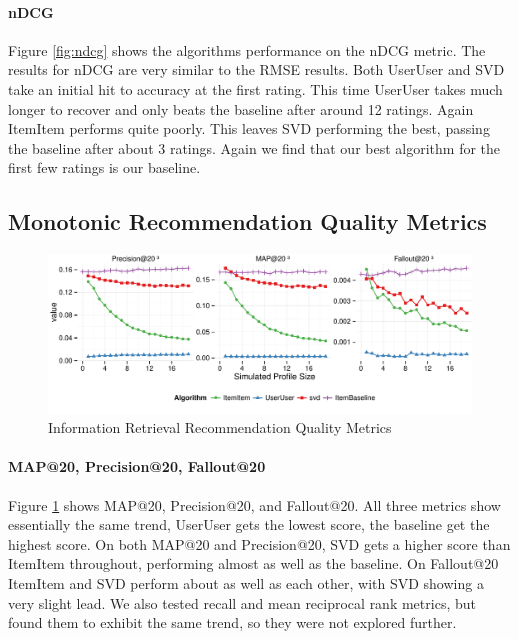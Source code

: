 \documentclass[letterpaper]{sig-alternate}
\begin{document}

  \paragraph{nDCG}
  Figure \ref{fig:ndcg} shows the algorithms performance on the nDCG metric.
  The results for nDCG are very similar to the RMSE results.
  Both UserUser and SVD take an initial hit to accuracy at the first rating.
  This time UserUser takes much longer to recover and only beats the baseline after around 12 ratings.
  Again ItemItem performs quite poorly.
  This leaves SVD performing the best, passing the baseline after about 3 ratings.
  Again we find that our best algorithm for the first few ratings is our baseline.
  


\subsection*{Monotonic Recommendation Quality Metrics}

\vspace{-1.5em}

\begin{figure}[ht!]
  \centering
  \includegraphics[width=\linewidth]{../lenskit/output/ekstrandTuned20/TopNPrecision.pdf}
  \caption{Information Retrieval Recommendation Quality Metrics}
  \label{fig:map}
\end{figure}
%
\paragraph{MAP@20, Precision@20, Fallout@20}
  Figure \ref{fig:map} shows MAP@20, Precision@20, and Fallout@20.
  All three metrics show essentially the same trend, UserUser gets the lowest score, the baseline get the highest score.
  On both MAP@20 and Precision@20, SVD gets a higher score than ItemItem throughout, performing almost as well as the baseline.
  On Fallout@20 ItemItem and SVD perform about as well as each other, with SVD showing a very slight lead.
  We also tested recall and mean reciprocal rank metrics, but found them to exhibit the same trend, so they were not explored further.
\end{document}
